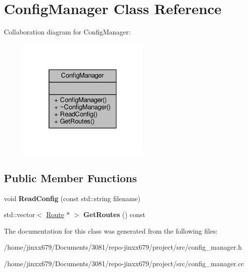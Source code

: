 \hypertarget{classConfigManager}{}\section{Config\+Manager Class Reference}
\label{classConfigManager}


Collaboration diagram for Config\+Manager\+:\nopagebreak
\begin{figure}[H]
\begin{center}
\leavevmode
\includegraphics[width=184pt]{classConfigManager__coll__graph}
\end{center}
\end{figure}
\subsection*{Public Member Functions}
\begin{DoxyCompactItemize}
\item 
\mbox{\label{classConfigManager_ab8087a9f44ddaa001ea361b56514e64a}} 
void {\bfseries Read\+Config} (const std\+::string filename)
\item 
\mbox{\label{classConfigManager_a0db6329b7dd5ac1f92ee262c30df4ef9}} 
std\+::vector$<$ \hyperlink{classRoute}{Route} $\ast$ $>$ {\bfseries Get\+Routes} () const
\end{DoxyCompactItemize}


The documentation for this class was generated from the following files\+:\begin{DoxyCompactItemize}
\item 
/home/jinxx679/\+Documents/3081/repo-\/jinxx679/project/src/config\+\_\+manager.\+h\item 
/home/jinxx679/\+Documents/3081/repo-\/jinxx679/project/src/config\+\_\+manager.\+cc\end{DoxyCompactItemize}
